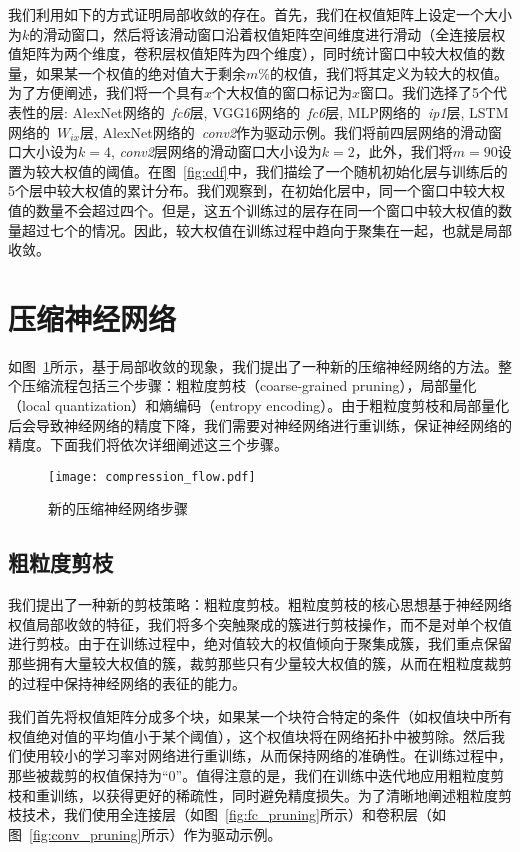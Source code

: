 我们利用如下的方式证明局部收敛的存在。首先，我们在权值矩阵上设定一个大小为$k$的滑动窗口，然后将该滑动窗口沿着权值矩阵空间维度进行滑动（全连接层权值矩阵为两个维度，卷积层权值矩阵为四个维度），同时统计窗口中较大权值的数量，如果某一个权值的绝对值大于剩余$m\%$的权值，我们将其定义为较大的权值。为了方便阐述，我们将一个具有$x$个大权值的窗口标记为$x$窗口。我们选择了5个代表性的层: AlexNet网络的~\emph{fc6}层, VGG16网络的~\emph{fc6}层, MLP网络的~\emph{ip1}层, LSTM网络的~\emph{$W_{ix}$}层, AlexNet网络的~\emph{conv2}作为驱动示例。我们将前四层网络的滑动窗口大小设为$k = 4$, \emph{conv2}层网络的滑动窗口大小设为$k = 2$，此外，我们将$m = 90$设置为较大权值的阈值。在图~\ref{fig:cdf}中，我们描绘了一个随机初始化层与训练后的5个层中较大权值的累计分布。我们观察到，在初始化层中，同一个窗口中较大权值的数量不会超过四个。但是，这五个训练过的层存在同一个窗口中较大权值的数量超过七个的情况。因此，较大权值在训练过程中趋向于聚集在一起，也就是局部收敛。


\section{压缩神经网络}


如图~\ref{fig:compression_flow}所示，基于局部收敛的现象，我们提出了一种新的压缩神经网络的方法。整个压缩流程包括三个步骤：粗粒度剪枝（coarse-grained pruning），局部量化（local quantization）和熵编码（entropy encoding）。由于粗粒度剪枝和局部量化后会导致神经网络的精度下降，我们需要对神经网络进行重训练，保证神经网络的精度。下面我们将依次详细阐述这三个步骤。

\begin{figure}[h]
\centering
\texttt{[image: compression\_flow.pdf]}
\caption{新的压缩神经网络步骤}
\label{fig:compression_flow}
\end{figure}


\subsection{粗粒度剪枝}

我们提出了一种新的剪枝策略：粗粒度剪枝。粗粒度剪枝的核心思想基于神经网络权值局部收敛的特征，我们将多个突触聚成的簇进行剪枝操作，而不是对单个权值进行剪枝。由于在训练过程中，绝对值较大的权值倾向于聚集成簇，我们重点保留那些拥有大量较大权值的簇，裁剪那些只有少量较大权值的簇，从而在粗粒度裁剪的过程中保持神经网络的表征的能力。

我们首先将权值矩阵分成多个块，如果某一个块符合特定的条件（如权值块中所有权值绝对值的平均值小于某个阈值），这个权值块将在网络拓扑中被剪除。然后我们使用较小的学习率对网络进行重训练，从而保持网络的准确性。在训练过程中，那些被裁剪的权值保持为“0”。值得注意的是，我们在训练中迭代地应用粗粒度剪枝和重训练，以获得更好的稀疏性，同时避免精度损失。为了清晰地阐述粗粒度剪枝技术，我们使用全连接层（如图~\ref{fig:fc_pruning}所示）和卷积层（如图~\ref{fig:conv_pruning}所示）作为驱动示例。

